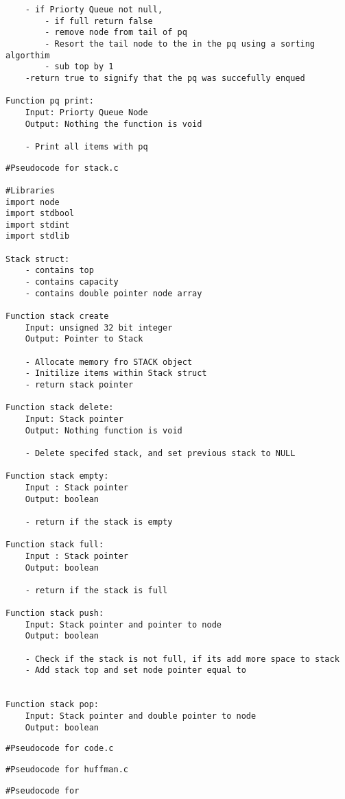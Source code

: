 \documentclass[11pt]{article} %
\begin{document}
\begin{flushleft}
\begin{lstlisting}
    - if Priorty Queue not null, 
        - if full return false
        - remove node from tail of pq
        - Resort the tail node to the in the pq using a sorting algorthim
        - sub top by 1
    -return true to signify that the pq was succefully enqued 

Function pq print:
    Input: Priorty Queue Node
    Output: Nothing the function is void
    
    - Print all items with pq  
\end{lstlisting}

\begin{lstlisting}
#Pseudocode for stack.c

#Libraries
import node
import stdbool
import stdint
import stdlib

Stack struct:
    - contains top
    - contains capacity
    - contains double pointer node array

Function stack create 
    Input: unsigned 32 bit integer 
    Output: Pointer to Stack

    - Allocate memory fro STACK object
    - Initilize items within Stack struct
    - return stack pointer

Function stack delete:
    Input: Stack pointer 
    Output: Nothing function is void

    - Delete specifed stack, and set previous stack to NULL

Function stack empty:
    Input : Stack pointer
    Output: boolean
    
    - return if the stack is empty
     
Function stack full:
    Input : Stack pointer
    Output: boolean
    
    - return if the stack is full

Function stack push:
    Input: Stack pointer and pointer to node
    Output: boolean
    
    - Check if the stack is not full, if its add more space to stack
    - Add stack top and set node pointer equal to 


Function stack pop:
    Input: Stack pointer and double pointer to node
    Output: boolean
\end{lstlisting}

\begin{lstlisting}
#Pseudocode for code.c

\end{lstlisting}
\begin{lstlisting}
#Pseudocode for huffman.c

\end{lstlisting}

\begin{lstlisting}
#Pseudocode for 

\end{lstlisting}
\end{flushleft}
\end{document}
